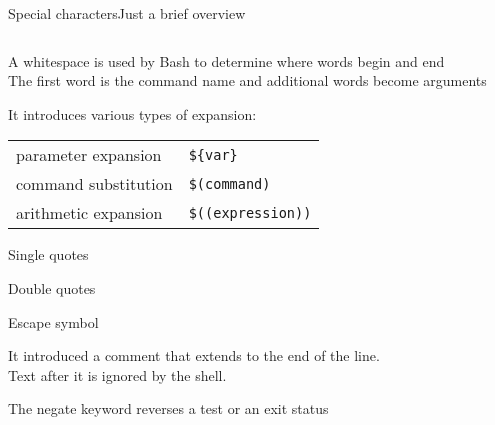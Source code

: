\begin{frame}[fragile]{Special characters}{Just a brief overview}
    \vspace{-5mm}
    \begin{columns}
        \begin{column}{\dimexpr\paperwidth-10mm}
            \begin{description}[\texttt{>  >>  <}]
                \setlength{\itemsep}{1mm}
                \item<only@1>[\texttt{\textvisiblespace}]
                    A \alert{white}\alert{space} is used by Bash to determine where words begin and end \\
                    The first word is the command name and additional words become arguments
                \item<only@1>[\texttt{\$}]
                    It introduces various types of \alert{expansion}:
                    \begin{tabular}{ll}
                        \PB{$\bullet\;$} parameter expansion   & \texttt{\$\{var\}}          \\
                        \PB{$\bullet\;$} command substitution  & \texttt{\$(command)}      \\
                        \PB{$\bullet\;$} arithmetic expansion  & \texttt{\$((expression))} \\
                    \end{tabular}
                \item<only@1>[\texttt{' '}] \alert{Single quotes}
                \item<only@1>[\texttt{" "}] \alert{Double quotes}
                \item<only@1>[\texttt{\textbackslash}] \alert{Escape symbol}
                \item<only@1>[\texttt{\#}]
                    It introduced a \alert{comment} that extends to the end of the line. \\
                    Text after it is ignored by the shell. 
                \item<only@1>[\texttt{!}]
                    The \alert{negate keyword} reverses a test or an exit status\\[-1mm]

\end{description}
\end{column}
\end{columns}
\end{frame}

